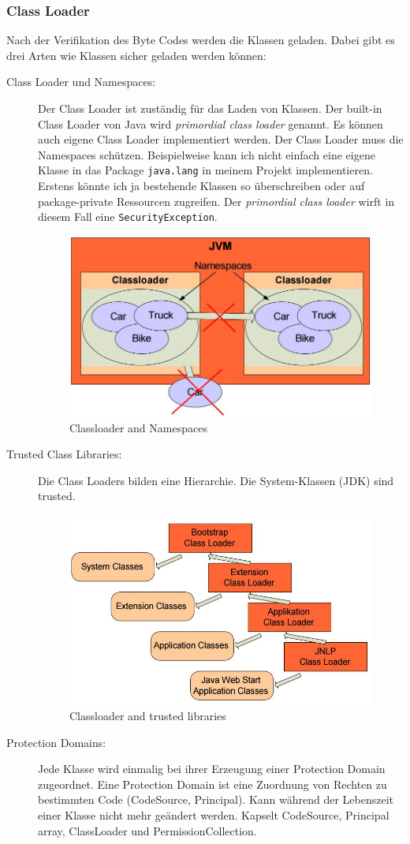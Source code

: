 \subsubsection{Class Loader}
Nach der Verifikation des Byte Codes werden die Klassen geladen. Dabei gibt es drei Arten wie Klassen sicher geladen werden können:
\begin{description}
	\item[Class Loader und Namespaces:] Der Class Loader ist zuständig für das Laden von Klassen. Der built-in Class Loader von Java wird \emph{primordial class loader} genannt. Es können auch eigene Class Loader implementiert werden. Der Class Loader muss die Namespaces schützen. Beispielweise kann ich nicht einfach eine eigene Klasse in das Package \verb|java.lang| in meinem Projekt implementieren. Erstens könnte ich ja bestehende Klassen so überschreiben oder auf package-private Ressourcen zugreifen. Der \emph{primordial class loader} wirft in diesem Fall eine \verb|SecurityException|.
	
	\begin{figure}[h!]
	\centering
	\includegraphics[width=0.7\linewidth]{fig/java-platform-namespaces}
	\caption{Classloader and Namespaces}
	\label{fig:java-platform-namespaces}
	\end{figure}

	\item[Trusted Class Libraries:] Die Class Loaders bilden eine Hierarchie. Die System-Klassen (JDK) sind trusted.
	\begin{figure}[h!]
	\centering
	\includegraphics[width=0.5\linewidth]{fig/java-classloader-trusted-libraries}
	\caption{Classloader and trusted libraries}
	\label{fig:java-classloader-trusted-libraries}
	\end{figure}

	\item[Protection Domains:] Jede Klasse wird einmalig bei ihrer Erzeugung einer Protection Domain zugeordnet. Eine Protection Domain ist eine Zuordnung von Rechten zu bestimmten Code (CodeSource, Principal). Kann während der Lebenszeit einer Klasse nicht mehr geändert werden. Kapselt CodeSource, Principal array, ClassLoader und PermissionCollection.
\end{description}


